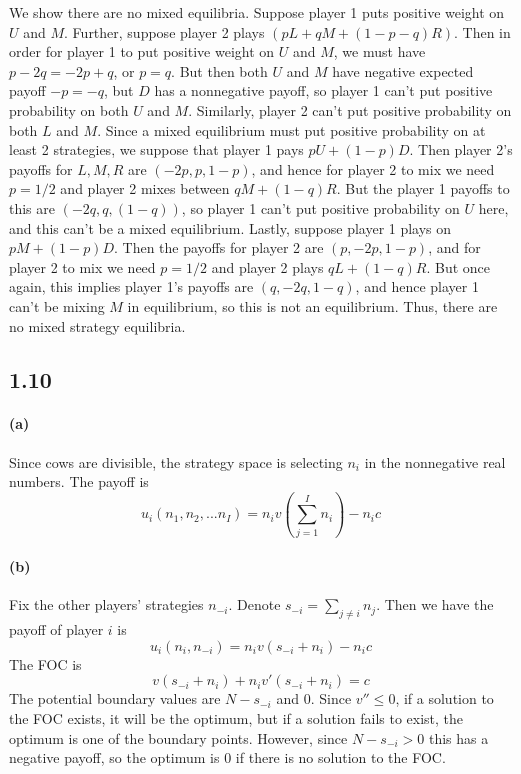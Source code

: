 \documentclass[10pt,letter]{article}
\begin{document}
We show there are no mixed equilibria. Suppose player 1 puts positive weight on $U$ and $M$. Further, suppose player 2 plays $(pL + qM + (1-p-q)R)$. Then in order for player 1 to put positive weight on $U$ and $M$, we must have $p - 2q = -2p + q$, or $p = q$. But then both $U$ and $M$ have negative expected payoff $-p = -q$, but $D$ has a nonnegative payoff, so player 1 can't put positive probability on both $U$ and $M$.
Similarly, player 2 can't put positive probability on both $L$ and $M$.
Since a mixed equilibrium must put positive probability on at least 2 strategies, we suppose that player 1 pays $pU + (1-p) D$.
Then player 2's payoffs for $L,M,R$ are $(-2p, p, 1-p)$, and hence for player 2 to mix we need $p = 1/2$ and player 2 mixes between $qM + (1-q)R$.
But the player 1 payoffs to this are $(-2q, q, (1-q))$, so player 1 can't put positive probability on $U$ here, and this can't be a mixed equilibrium.
Lastly, suppose player 1 plays on $pM + (1-p)D$. Then the payoffs for player 2 are $(p, -2p, 1-p)$, and for player 2 to mix we need $p = 1/2$ and player 2 plays $qL + (1-q)R$. But once again, this implies player 1's payoffs are $(q, -2q, 1-q)$, and hence player 1 can't be mixing $M$ in equilibrium, so this is not an equilibrium.
Thus, there are no mixed strategy equilibria.

\subsection*{1.10}
\paragraph{(a)}
Since cows are divisible, the strategy space is selecting $n_i$ in the nonnegative real numbers. The payoff is
\[ u_i(n_1, n_2, ... n_I) = n_i v\left(\sum_{j=1}^I n_i \right) - n_i c \]
\paragraph{(b)} Fix the other players' strategies $n_{-i}$. Denote $s_{-i} = \sum_{j \neq i} n_j$. Then we have the payoff of player $i$ is
\[ u_i(n_i, n_{-i}) = n_i v(s_{-i} + n_i) - n_i c \]
The FOC is
\[ v(s_{-i} + n_i) + n_i v'(s_{-i} + n_i) = c \]
The potential boundary values are $N - s_{-i}$ and $0$. Since $v'' \le 0$, if a solution to the FOC exists, it will be the optimum, but if a solution fails to exist, the optimum is one of the boundary points. However, since $N - s_{-i} > 0$ this has a negative payoff, so the optimum is 0 if there is no solution to the FOC.
\end{document}
